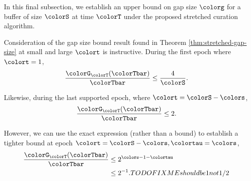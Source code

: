In this final subsection, we establish an upper bound on gap size $\colorg$ for a buffer of size $\colorS$ at time $\colorT$ under the proposed stretched curation algorithm.





Consideration of the gap size bound result found in Theorem \ref{thm:stretched-gap-size} at small and large $\colort$ is instructive.
During the first epoch where $\colort = 1$,
\begin{align*}
\frac{\colorG_{\colorT}(\colorTbar)}{\colorTbar}
\leq
\frac{4}{\colorS}.
\end{align*}

Likewise, during the last supported epoch, where $\colort = \colorS - \colors$,
\begin{align*}
\frac{\colorG_{\colorT}(\colorTbar)}{\colorTbar}
\leq
2.
\end{align*}

However, we can use the exact expression (rather than a bound) to establish a tighter bound at epoch $\colort = \colorS - \colors, \colortau = \colors$,
\begin{align*}
\frac{\colorG_{\colorT}(\colorTbar)}{\colorTbar}
&\leq
2^{\colors - 1 - \colortau}\\
&\leq
2^{- 1}. TODO FIXME should be 1 not 1/2
\end{align*}

